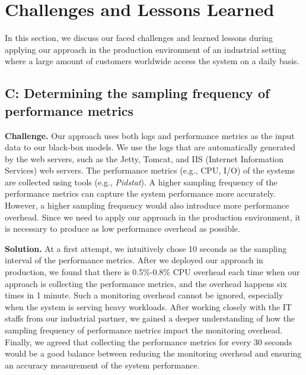 \section{Challenges and Lessons Learned} \label{sec:challenges}
In this section, we discuss our faced challenges and learned lessons during applying our approach in the production environment of an industrial setting where a large amount of customers worldwide access the system on a daily basis.

\setcounter{ChallengeCount}{0}


\subsection*{C: Determining the sampling frequency of performance metrics}
\noindent\textbf{Challenge.}
Our approach uses both logs and performance metrics as the input data to our black-box models. We use the logs that are automatically generated by the web servers, such as the Jetty, Tomcat, and IIS (Internet Information Services) web servers. 
The performance metrics (e.g., CPU, I/O) of the systems are collected using tools (e.g., \emph{Pidstat}).
A higher sampling frequency of the performance metrics can capture the system performance more accurately. However, a higher sampling frequency would also introduce more performance overhead. Since we need to apply our approach in the production environment, it is necessary to produce as low performance overhead as possible.

\noindent\textbf{Solution.}
At a first attempt, we intuitively chose 10 seconds as the sampling interval of the performance metrics. After we deployed our approach in production, we found that there is 0.5\%-0.8\% CPU overhead each time when our approach is collecting the performance metrics, and the overhead happens six times in 1 minute. Such a monitoring overhead cannot be ignored, especially when the system is serving heavy workloads. After working closely with the IT staffs from our industrial partner, we gained a deeper understanding of how the sampling frequency of performance metrics impact the monitoring overhead. Finally, we agreed that collecting the performance metrics for every 30 seconds would be a good balance between reducing the monitoring overhead and ensuring an accuracy measurement of the system performance.


